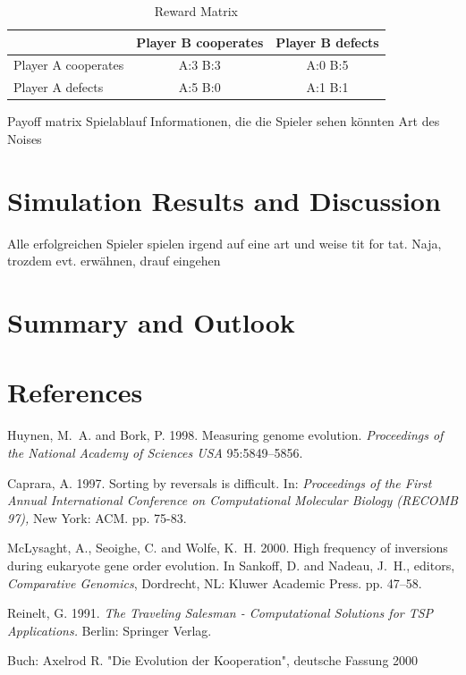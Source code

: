 \documentclass[11pt,twoside]{article}
\begin{document}
\begin{table}


 \begin{center}
\begin{tabular}{|l|c|c|}
	  
\hline
   & Player B cooperates & Player B defects \\
  \hline
  Player A cooperates & A:3  B:3 & A:0  B:5  \\
 \hline
  Player A defects & A:5  B:0 &A:1 B:1 \\
 \hline
\end{tabular}
 \end{center}
 \caption{Reward Matrix}
\end{table}

Payoff matrix
Spielablauf
Informationen, die die Spieler sehen könnten
Art des Noises

\section{Simulation Results and Discussion}
Alle erfolgreichen Spieler spielen irgend auf eine art und weise tit for tat. Naja, trozdem evt. erwähnen, drauf eingehen

\section{Summary and Outlook}




\section{References}

\footnotesize
 \begin{thebibliography}{99}

 Huynen, M.~A. and Bork, P. 1998. Measuring genome evolution. {\em
Proceedings of the National Academy of Sciences USA}
  95:5849--5856.

 Caprara, A. 1997. Sorting by reversals is difficult. In: {\em
Proceedings of the First Annual International Conference on Computational
Molecular Biology (RECOMB 97),} New York: ACM.  pp. 75-83.

McLysaght, A., Seoighe, C. and Wolfe, K.~H. 2000. High frequency
of inversions during eukaryote gene order evolution.     In Sankoff, D. and
Nadeau, J.~H., editors, {\em Comparative Genomics},  Dordrecht, NL: Kluwer
Academic Press. pp. 47--58.

 Reinelt, G. 1991. {\em The Traveling Salesman - Computational
Solutions for TSP Applications.} Berlin: Springer Verlag.

\end{thebibliography}





Buch: Axelrod R. "Die Evolution der Kooperation", deutsche Fassung 2000

\appendix

\end{document}
